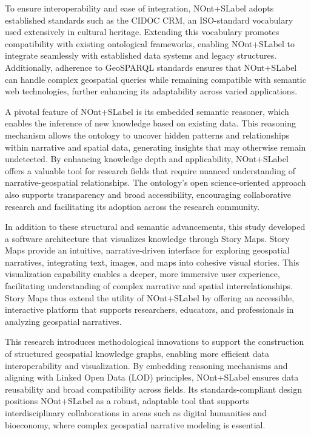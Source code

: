 To ensure interoperability and ease of integration, \acrshort{NOnt+SLabel} adopts established standards such as the CIDOC CRM, an ISO-standard vocabulary used extensively in cultural heritage. Extending this vocabulary promotes compatibility with existing ontological frameworks, enabling \acrshort{NOnt+SLabel} to integrate seamlessly with established data systems and legacy structures. Additionally, adherence to GeoSPARQL standards ensures that \acrshort{NOnt+SLabel} can handle complex geospatial queries while remaining compatible with semantic web technologies, further enhancing its adaptability across varied applications.

A pivotal feature of \acrshort{NOnt+SLabel} is its embedded semantic reasoner, which enables the inference of new knowledge based on existing data. This reasoning mechanism allows the ontology to uncover hidden patterns and relationships within narrative and spatial data, generating insights that may otherwise remain undetected. By enhancing knowledge depth and applicability, \acrshort{NOnt+SLabel} offers a valuable tool for research fields that require nuanced understanding of narrative-geospatial relationships. The ontology’s open science-oriented approach also supports transparency and broad accessibility, encouraging collaborative research and facilitating its adoption across the research community.

In addition to these structural and semantic advancements, this study developed a software architecture that visualizes knowledge through Story Maps. Story Maps provide an intuitive, narrative-driven interface for exploring geospatial narratives, integrating text, images, and maps into cohesive visual stories. This visualization capability enables a deeper, more immersive user experience, facilitating understanding of complex narrative and spatial interrelationships. Story Maps thus extend the utility of \acrshort{NOnt+SLabel} by offering an accessible, interactive platform that supports researchers, educators, and professionals in analyzing geospatial narratives.

This research introduces methodological innovations to support the construction of structured geospatial knowledge graphs, enabling more efficient data interoperability and visualization. By embedding reasoning mechanisms and aligning with Linked Open Data (LOD) principles, \acrshort{NOnt+SLabel} ensures data reusability and broad compatibility across fields. Its standards-compliant design positions \acrshort{NOnt+SLabel} as a robust, adaptable tool that supports interdisciplinary collaborations in areas such as digital humanities and bioeconomy, where complex geospatial narrative modeling is essential.


